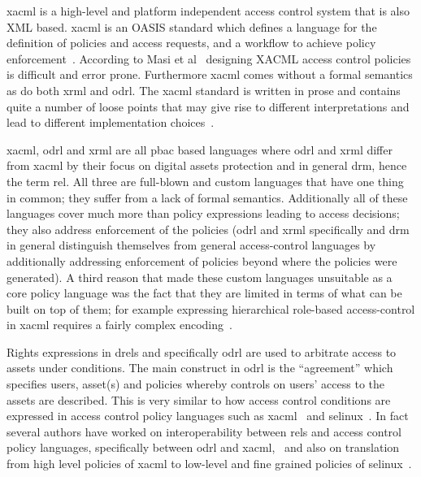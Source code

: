 \ac{xacml} is a high-level and platform independent access control system that is also XML based. \ac{xacml} is an OASIS standard which defines a language for the definition of policies and access requests, and a workflow to achieve policy enforcement~\cite{DBLP:conf/essos/MasiPT12}. According to Masi et al~\cite{DBLP:conf/essos/MasiPT12} designing XACML access control policies is difficult and error prone. Furthermore \ac{xacml} comes without a formal semantics as do both \ac{xrml} and \ac{odrl}. The \ac{xacml} standard is written in prose and contains quite a number of loose points that may give rise to different interpretations and lead to different implementation choices~\cite{DBLP:conf/essos/MasiPT12}.

\ac{xacml}, \ac{odrl} and \ac{xrml} are all \ac{pbac} based languages where \ac{odrl} and \ac{xrml} differ from \ac{xacml} by their focus on digital assets protection and in general \ac{drm}, hence the term \ac{rel}. All three are full-blown and custom languages that have one thing in common; they suffer from a lack of formal semantics. Additionally all of these languages cover much more than policy expressions leading to access decisions; they also address enforcement of the policies (\ac{odrl} and \ac{xrml} specifically and \ac{drm} in general distinguish themselves from general access-control languages by additionally addressing enforcement of policies beyond where the policies were generated). A third reason that made these custom languages unsuitable as a core policy language was the fact that they are limited in terms of what can be built on top of them; for example expressing hierarchical role-based access-control  in \ac{xacml} requires a fairly complex encoding~\cite{Tschantz}.

Rights expressions in \ac{drel}s and specifically \ac{odrl} are used to arbitrate access to assets under conditions. The main construct in \ac{odrl} is the ``agreement'' which specifies users, asset(s) and policies whereby controls on users' access to the assets are described. This is very similar to how access control conditions are expressed in access control policy languages such as \ac{xacml}~\cite{xacml} and \ac{selinux}~\cite{selinux}. In fact several authors have worked on interoperability between \ac{rel}s and access control policy languages, specifically between \ac{odrl} and \ac{xacml},~\cite{prados2005interoperability, maronas2009architecture} and also on translation from high level policies of \ac{xacml} to low-level and fine grained policies of \ac{selinux}~\cite{alam2008usage}. 

